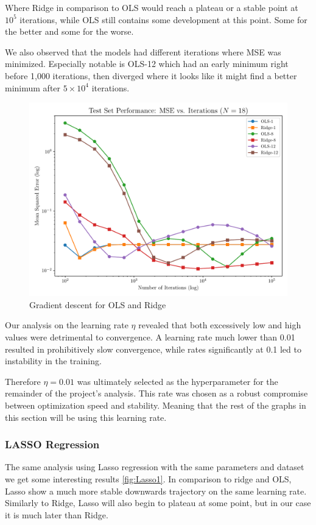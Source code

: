 \documentclass[twocolumn,aps]{revtex4}
\begin{document}
Where Ridge in comparison to OLS would reach a plateau or a stable point at $10^5$ iterations, while OLS still contains some development at this point. 
Some for the better and some for the worse.

We also observed that the models had different iterations where MSE was minimized.
Especially notable is OLS-12 which had an early minimum right before 1,000 iterations, then diverged where it looks like it might find a better minimum after $5 \times 10^4$ iterations.

\begin{figure}[h]
    \centering
    \includegraphics[width=.95 \linewidth]{Figures/Gradient_Comparison_OLS_Ridge_18.pdf}
    \caption{Gradient descent for OLS and Ridge}
    \label{fig:DescOLSRidge}
\end{figure}
Our analysis on the learning rate $\eta$ revealed that both excessively low and high values were detrimental to convergence.
A learning rate much lower than 0.01 resulted in prohibitively slow convergence, while rates significantly at 0.1 led to instability in the training.

Therefore $\eta=0.01$ was ultimately selected as the hyperparameter for the remainder of the project's analysis. 
This rate was chosen as a robust compromise between optimization speed and stability.
Meaning that the rest of the graphs in this section will be using this learning rate.


\subsubsection{LASSO Regression}
The same analysis using Lasso regression with the same parameters and dataset we get some interesting results \ref{fig:Lasso1}.
In comparison to ridge and OLS, Lasso show a much more stable downwards trajectory on the same learning rate.
Similarly to Ridge, Lasso will also begin to plateau at some point, but in our case it is much later than Ridge.
\end{document}
